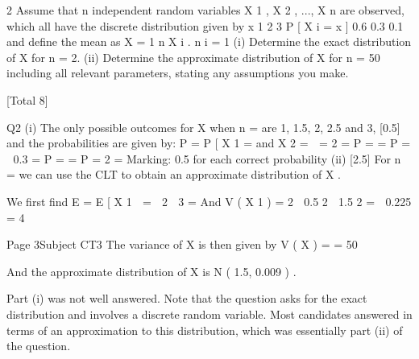 \documentclass[a4paper,12pt]{article}
\begin{document}
2
Assume that n independent random variables X 1 , X 2 , ..., X n are observed, which all
have the discrete distribution given by
x 1 2 3
P [ X i = x ] 0.6 0.3 0.1
and define the mean as X =
1 n
\sum X i .
n i = 1
(i) Determine the exact distribution of X for n = 2.
(ii) Determine the approximate distribution of X for n = 50 including all relevant
parameters, stating any assumptions you make.

[Total 8]

Q2
(i)
The only possible outcomes for X when n \;= are 1, 1.5, 2, 2.5 and 3,
[0.5]
and the probabilities are given by:
P \left[  X \;=\; 1 \right] \;=\; P [ X 1 \;= and X 2 \;=  \;= 2 \;=
P \left[  X \;=\; 1.5 \right] \;=   \;=
P \left[  X \;=\; 2 \right] \;=    0.3  \;=
P \left[  X \;=\; 2.5 \right] \;=   \;=
P \left[  X \;=\; 3 \right] \;= 2 \;=
Marking: 0.5 for each correct probability
(ii)
[2.5]
For n \;= we can use the CLT to obtain an approximate distribution of X .

We first find E \left[  X \right] \;=\; E [ X 1  \;=  2   3  \;=
And V ( X 1 ) \;= 2   0.5 2   1.5 2  \;=
 0.225 \;=
4


Page 3Subject CT3 %
The variance of X is then given by V ( X ) \;=
\;=
50

And the approximate distribution of X is N ( 1.5, 0.009 ) .

Part (i) was not well answered. Note that the question asks for the
exact distribution and involves a discrete random variable. Most
candidates answered in terms of an approximation to this distribution,
which was essentially part (ii) of the question.
\end{document}
